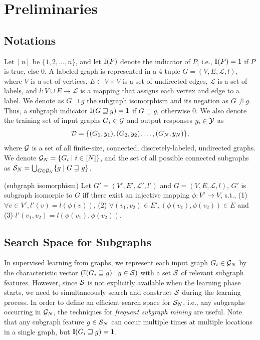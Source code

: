 \section{Preliminaries}
\subsection{Notations}
Let $[n]$ be $\{1,2,\dots,n\}$, and let $\I(P)$ denote the
indicator of $P$, i.e., $\I(P)=1$ if $P$ is true, else $0$. 
A labeled graph is represented in a 4-tuple $G = (V, E, \mathcal{L}, l)$, 
where $V$ is a set of vertices, $E \subset V \times V$ is a set of undirected edges, 
$\mathcal{L}$ is a set of labels, 
and $l: V \cup E \rightarrow \mathcal{L}$ is a mapping that assigns each vertex and edge to a label.
We denote as $G \sqsupseteq g$ the
subgraph isomorphism and its negation as $G \not\sqsupseteq g$. 
Thus, a subgraph indicator $\I(G \sqsupseteq g) = 1$ if $G \sqsupseteq g$, otherwise 0.
We also denote the training set of input graphs $G_i \in \Graph$ and output responses $y_i \in \Y$ as
\begin{equation}
  \label{eq:train_data}
  \D = \{(G_1,y_1),(G_2,y_2),\dots,(G_N,y_N)\}, 
\end{equation}
where $\Graph$ is a set of all finite-size, connected, discretely-labeled,
undirected graphs. We denote $\Graph_N = \{G_i\mid i \in [N]\}$, 
and the set of all possible connected subgraphs as $\S_N = \bigcup_{G \in \Graph_N} \{g \mid G \sqsupseteq g\}$.
\begin{definition}{(subgraph isomorphism)}
	Let $G' = (V', E', \mathcal{L}', l')$ and $G = (V, E, \mathcal{L}, l)$, 
	$G'$ is subgraph isomorpic to $G$ iff there exist an injective mapping $\phi: V' \rightarrow V$, 
	s.t., (1) $\forall v \in V', l'(v) = l(\phi(v))$, 
	(2) $\forall (v_{1}, v_{2}) \in E', (\phi(v_{1}), \phi(v_{2})) \in E$ and
	(3) $l'(v_{1}, v_{2}) = l(\phi(v_{1}), \phi(v_{2}))$.
\end{definition}

\subsection{Search Space for Subgraphs}
\label{sec:subgraphMining}
In supervised learning from graphs, we represent each input graph $G_i \in
\Graph_N$ by the characteristic vector $(\I(G_i \sqsupseteq g) \mid g \in
\S) $ with a set $\S$ of relevant subgraph features. However, since $\S$ is not
explicitly available when the learning phase starts, we need to
simultaneously search and construct $\S$ during the learning process.
In order to define an efficient search space for $\S_N$, i.e., any subgraphs occurring in $\Graph_N$,
the techniques for \textit{frequent subgraph mining} are
useful. Note that any subgraph feature
$g \in \S_N$ can occur multiple times at multiple locations in a single graph,
but $\I(G_i \sqsupseteq g) = 1$.

